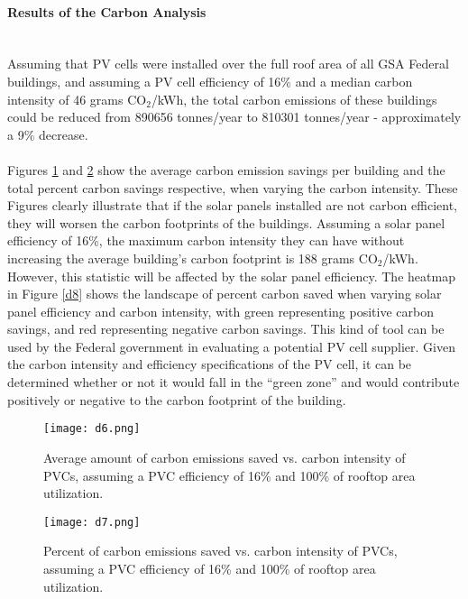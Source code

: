 \paragraph{Results of the Carbon Analysis} \mbox{ }\\
Assuming that PV cells were installed over the full roof area of all GSA Federal buildings, and assuming a PV cell efficiency of 16\% and a median carbon intensity of 46 grams CO$_{2}$/kWh, the total carbon emissions of these buildings could be reduced from 890656 tonnes/year to 810301 tonnes/year - approximately a 9\% decrease.
\\\\
\noindent Figures \ref{d6} and \ref{d7} show the average carbon emission savings per building and the total percent carbon savings respective, when varying the carbon intensity. These Figures clearly illustrate that if the solar panels installed are not carbon efficient, they will worsen the carbon footprints of the buildings. Assuming a solar panel efficiency of 16\%, the maximum carbon intensity they can have without increasing the average building's carbon footprint is 188 grams CO$_{2}$/kWh. However, this statistic will be affected by the solar panel efficiency. The heatmap in Figure \ref{d8} shows the landscape of percent carbon saved when varying solar panel efficiency and carbon intensity, with green representing positive carbon savings, and red representing negative carbon savings. This kind of tool can be used by the Federal government in evaluating a potential PV cell supplier. Given the carbon intensity and efficiency specifications of the PV cell, it can be determined whether or not it would fall in the ``green zone'' and would contribute positively or negative to the carbon footprint of the building.

\begin{figure}
\begin{center}
\texttt{[image: d6.png]}
\caption{Average amount of carbon emissions saved vs. carbon intensity of PVCs, assuming a PVC efficiency of 16\% and 100\% of rooftop area utilization.}
\label{d6}
\end{center}
\end{figure}


\begin{figure}
\begin{center}
\texttt{[image: d7.png]}
\caption{Percent of carbon emissions saved vs. carbon intensity of PVCs, assuming a PVC efficiency of 16\% and 100\% of rooftop area utilization.}
\label{d7}
\end{center}
\end{figure}


